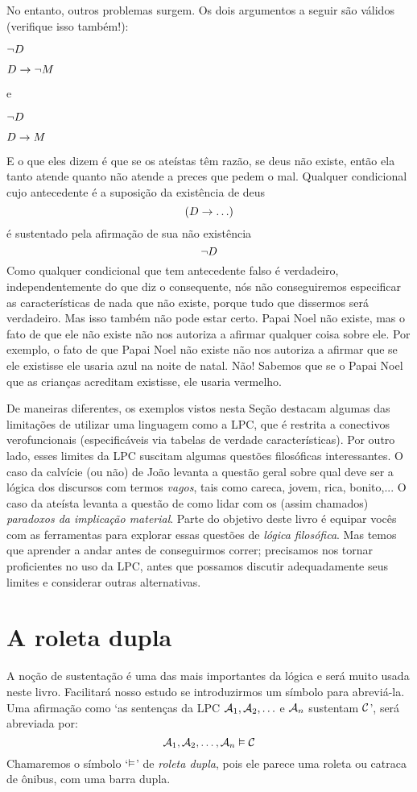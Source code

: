 No entanto, outros problemas surgem.
Os dois argumentos a seguir são válidos (verifique isso também!):
	\begin{earg}
		\item[] $\neg D$
		\item[\therefore] $D \rightarrow \neg M$
	\end{earg}
e
	\begin{earg}
		\item[] $\neg D$
		\item[\therefore] $D \rightarrow M$
	\end{earg}
E o que eles dizem é que se os ateístas têm razão, se deus não existe, então ela tanto atende quanto não atende a preces que pedem o mal.
Qualquer condicional cujo antecedente é a suposição da existência de deus
$$(D \rightarrow \ldots)$$
é sustentado pela afirmação de sua não existência
$$\neg D$$
Como qualquer condicional que tem antecedente falso é verdadeiro, independentemente do que diz o consequente,
nós não conseguiremos especificar as características de nada que não existe, porque tudo que dissermos será verdadeiro.
Mas isso também não pode estar certo.
Papai Noel não existe, mas o fato de que ele não existe não nos autoriza a afirmar qualquer coisa sobre ele.
Por exemplo, o fato de que Papai Noel não existe não nos autoriza a afirmar que se ele existisse ele usaria azul na noite de natal.
Não!
Sabemos que se o Papai Noel que as crianças acreditam existisse, ele usaria vermelho.
                
De maneiras diferentes, os exemplos vistos nesta Seção destacam algumas das limitações de utilizar uma linguagem como a LPC, que é restrita a conectivos verofuncionais (especificáveis via tabelas de verdade características).
Por outro lado, esses limites da LPC suscitam algumas questões filosóficas interessantes.
O caso da calvície (ou não) de João levanta a questão geral sobre qual deve ser a lógica dos discursos com termos \emph{vagos}, tais como careca, jovem, rica, bonito,... 
O caso da ateísta levanta a questão de como lidar com os (assim chamados) \emph{paradoxos da implicação material}.
Parte do objetivo deste livro é equipar vocês com as ferramentas para explorar essas questões de \emph{lógica filosófica}.
Mas temos que aprender a andar antes de conseguirmos correr; precisamos nos tornar proficientes no uso da LPC, antes que possamos discutir adequadamente seus limites e considerar outras alternativas.


\section{A roleta dupla}
A noção de sustentação é uma das mais importantes da lógica e será muito usada neste livro.
Facilitará nosso estudo se introduzirmos um símbolo para abreviá-la.
Uma afirmação como `as sentenças da LPC $\mathcal{A}_1, \mathcal{A}_2, \ldots$ e $\mathcal{A}_n$ sustentam $\mathcal{C}$', será abreviada por:
	$$\mathcal{A}_1, \mathcal{A}_2, \ldots, \mathcal{A}_n \vDash \mathcal{C}$$
Chamaremos o símbolo `$\vDash$' de \emph{roleta dupla}, pois ele parece uma roleta ou catraca de ônibus, com uma barra dupla.

